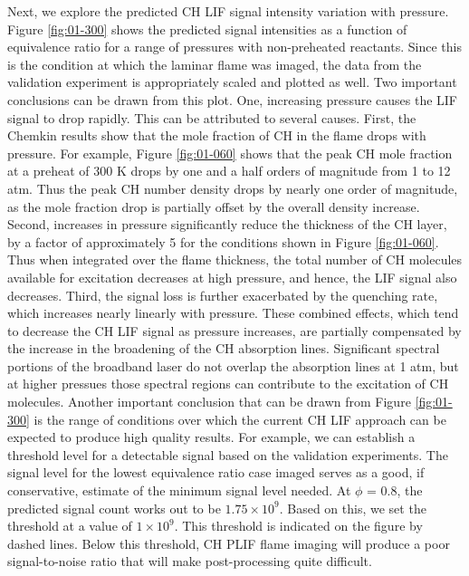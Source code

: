 

Next, we explore the predicted CH LIF signal intensity variation with pressure.
Figure \ref{fig:01-300} shows the predicted signal intensities as a function of equivalence ratio for a range of pressures with non-preheated reactants.
Since this is the condition at which the laminar flame was imaged, the data from the validation experiment is appropriately scaled and plotted as well.
Two important conclusions can be drawn from this plot.
One, increasing pressure causes the LIF signal to drop rapidly.
This can be attributed to several causes.
First, the Chemkin results show that the mole fraction of CH in the flame drops with pressure.
For example, Figure \ref{fig:01-060} shows that the peak CH mole fraction at a preheat of 300 K drops by one and a half orders of magnitude from 1 to 12 atm.
Thus the peak CH number density drops by nearly one order of magnitude, as the mole fraction drop is partially offset by the overall density increase.
Second, increases in pressure significantly reduce the thickness of the CH layer, by a factor of approximately 5 for the conditions shown in Figure \ref{fig:01-060}.
Thus when integrated over the flame thickness, the total number of CH molecules available for excitation decreases at high pressure, and hence, the LIF signal also decreases.
Third, the signal loss is further exacerbated by the quenching rate, which increases nearly linearly with pressure.
These combined effects, which tend to decrease the CH LIF signal as pressure increases, are partially compensated by the increase in the broadening of the CH absorption lines. 
Significant spectral portions of the broadband laser do not overlap the absorption lines at 1 atm, but at higher pressues those spectral regions can contribute to the excitation of CH molecules. 
Another important conclusion that can be drawn from Figure \ref{fig:01-300} is the range of conditions over which the current CH LIF approach can be expected to produce high quality results.
For example, we can establish a threshold level for a detectable signal based on the validation experiments.
The signal level for the lowest equivalence ratio case imaged serves as a good, if conservative, estimate of the minimum signal level needed.
At \(\phi\) = 0.8, the predicted signal count works out to be \(1.75\times10^9\).
Based on this, we set the threshold at a value of \(1\times10^9\).
This threshold is indicated on the figure by dashed lines.
Below this threshold, CH PLIF flame imaging will produce a poor signal-to-noise ratio that will make post-processing quite difficult.

